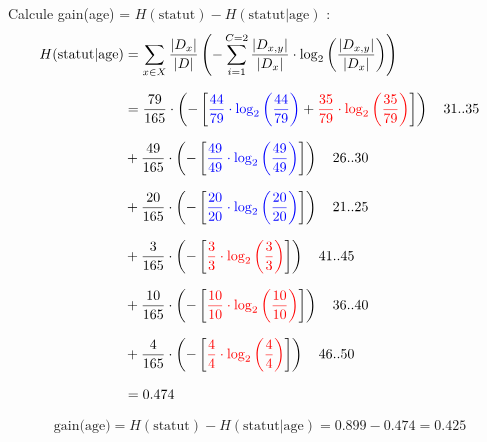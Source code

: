 \documentclass{article}
\begin{document}
\vspace{0.45cm}

Calcule gain(age) = $H(\text{statut}) - H(\text{statut} | \text{age})$ :
\begin{align*}
    H(\text{statut} | \text{age}) &= \sum_{x\in X} \dfrac{|D_x|}{|D|} \left( - \sum_{i=1} ^{C=2} \dfrac{|D_{x,y}|}{|D_x|} \cdot \log_2 \left( \dfrac{|D_{x,y}|}{|D_x|} \right) \right)\\[0.25cm]
                                  &= \dfrac{79}{165} \cdot \left( - \left[ \textcolor{blue}{\dfrac{44}{79} \cdot \log_2\left (\dfrac{44}{79} \right)} +   \textcolor{red}{\dfrac{35}{79} \cdot \log_2\left (\dfrac{35}{79} \right)} \right]  \right) \quad \text{31..35}\\[0.25cm]
                                  &+ \dfrac{49}{165} \cdot \left( - \left[ \textcolor{blue}{\dfrac{49}{49} \cdot \log_2\left (\dfrac{49}{49} \right)} \right]  \right) \quad \text{26..30}\\[0.25cm]
                                  &+ \dfrac{20}{165} \cdot \left( - \left[ \textcolor{blue}{\dfrac{20}{20} \cdot \log_2\left (\dfrac{20}{20} \right)}  \right]  \right) \quad \text{21..25}\\[0.25cm]
                                  &+ \dfrac{3}{165} \cdot \left( - \left[ \textcolor{red}{\dfrac{3}{3} \cdot \log_2\left (\dfrac{3}{3} \right)}  \right]  \right) \quad \text{41..45}\\[0.25cm]
                                  &+ \dfrac{10}{165} \cdot \left( - \left[ \textcolor{red}{\dfrac{10}{10} \cdot \log_2\left (\dfrac{10}{10} \right)}  \right]  \right) \quad \text{36..40}\\[0.25cm]
                                  &+ \dfrac{4}{165} \cdot \left( - \left[ \textcolor{red}{\dfrac{4}{4} \cdot \log_2\left (\dfrac{4}{4} \right)}  \right]  \right) \quad \text{46..50}\\[0.25cm]
                                  & = 0.474
\end{align*}


\vspace{-0.15cm}

\[\text{gain(age)} = H(\text{statut}) - H(\text{statut} | \text{age}) = 0.899 - 0.474 = 0.425\]

\vspace{0.45cm}
\end{document}
